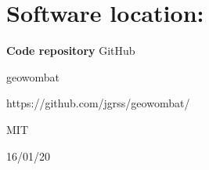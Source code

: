 \documentclass{jors}
\begin{document}
\section*{Software location:}





{\bf Code repository} 
GitHub

\begin{description}[noitemsep,topsep=0pt]
	\item[Name:] geowombat
	\item[Persistent identifier:] https://github.com/jgrss/geowombat/ %
	\item[Licence:] MIT
	\item[Date published:]  16/01/20
\end{description}


\end{document}
